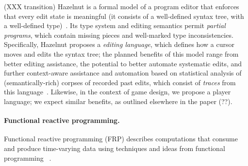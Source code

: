 (XXX transition)
Hazelnut is a formal model of a program editor that enforces that
every edit state is meaningful (it consists of a well-defined syntax
tree, with a well-defined type)~\cite{omar17hazelnut}.
%
Its type system and editing semantics permit \emph{partial programs},
which contain missing pieces and well-marked type inconsistencies.
%
Specifically, Hazelnut proposes a \emph{editing language}, which
defines how a cursor moves and edits the syntax tree; the planned
benefits of this model range from better editing assistance, the
potential to better automate systematic edits, and further
context-aware assistance and automation based on statistical analysis
of (semantically-rich) corpses of recorded past edits, which consist
of \emph{traces} from this language~\cite{omar17hazel}.
%
Likewise, in the context of game design, we propose a player language;
we expect similar benefits, as outlined elsewhere in the paper (??).

\paragraph{Functional reactive programming.}
%
Functional reactive programming (FRP) describes computations that
consume and produce time-varying data using techniques and ideas from
functional programming~
\citep{ElliottHu97,WanHu00,Cooper06embeddingdynamic,Krishnaswami11,Krishnaswami13,Czaplicki2013AFR}.


